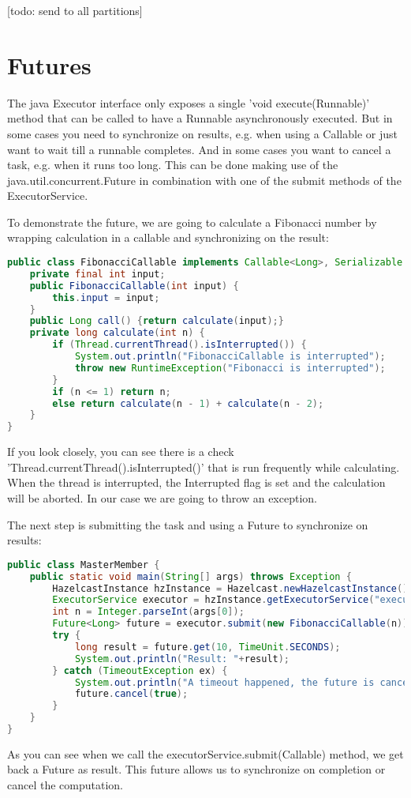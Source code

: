 [todo: send to all partitions]

\section{Futures}
The java Executor interface only exposes a single 'void execute(Runnable)' method that can be called to have a Runnable asynchronously executed. But in some cases you need to synchronize on results, e.g. when using a Callable or just want to wait till a runnable completes. And in some cases you want to cancel a task, e.g. when it runs too long. This can be done making use of the java.util.concurrent.Future in combination with one of the submit methods of the ExecutorService.

To demonstrate the future, we are going to calculate a Fibonacci number by wrapping calculation in a callable and synchronizing on the result:
\begin{lstlisting}[language=java]
public class FibonacciCallable implements Callable<Long>, Serializable {
    private final int input;
    public FibonacciCallable(int input) {
        this.input = input;
    }
    public Long call() {return calculate(input);}
    private long calculate(int n) {
        if (Thread.currentThread().isInterrupted()) {
            System.out.println("FibonacciCallable is interrupted");
            throw new RuntimeException("Fibonacci is interrupted");
        }
        if (n <= 1) return n;
        else return calculate(n - 1) + calculate(n - 2);
    }
}
\end{lstlisting}
If you look closely, you can see there is a check 'Thread.currentThread().isInterrupted()' that is run frequently while calculating. When the thread is interrupted, the Interrupted flag is set and the calculation will be aborted. In our case we are going to throw an exception.

The next step is submitting the task and using a Future to synchronize on results:
\begin{lstlisting}[language=java]
public class MasterMember {
    public static void main(String[] args) throws Exception {
        HazelcastInstance hzInstance = Hazelcast.newHazelcastInstance();
        ExecutorService executor = hzInstance.getExecutorService("executor");
        int n = Integer.parseInt(args[0]);
        Future<Long> future = executor.submit(new FibonacciCallable(n));
        try {
            long result = future.get(10, TimeUnit.SECONDS);
            System.out.println("Result: "+result);
        } catch (TimeoutException ex) {
            System.out.println("A timeout happened, the future is cancelled");
            future.cancel(true);
        }
    }
}
\end{lstlisting}
As you can see when we call the executorService.submit(Callable) method, we get back a Future as result. This future allows us to synchronize on completion or cancel the computation. 

